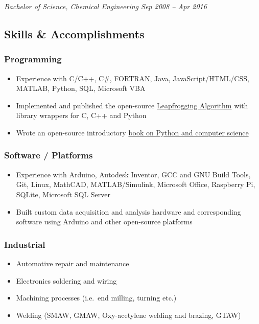 \emph{Bachelor of Science, Chemical Engineering \textbar{} Sep 2008 --
Apr 2016}

\hypertarget{skills-accomplishments}{%
\subsection{Skills \& Accomplishments}\label{skills-accomplishments}}

\hypertarget{programming}{%
\subsubsection{Programming}\label{programming}}

\begin{itemize}
\tightlist
\item
  Experience with C/C++, C\#, FORTRAN, Java, JavaScript/HTML/CSS,
  MATLAB, Python, SQL, Microsoft VBA
\item
  Implemented and published the open-source
  \href{https://github.com/flythereddflagg/lpfgopt}{Leapfrogging
  Algorithm} with library wrappers for C, C++ and Python
\item
  Wrote an open-source introductory
  \href{https://flythereddflagg.github.io/python_book/site/index.html}{book
  on Python and computer science}
\end{itemize}

\hypertarget{software-platforms}{%
\subsubsection{Software / Platforms}\label{software-platforms}}

\begin{itemize}
\tightlist
\item
  Experience with Arduino, Autodesk Inventor, GCC and GNU Build Tools,
  Git, Linux, MathCAD, MATLAB/Simulink, Microsoft Office, Raspberry Pi,
  SQLite, Microsoft SQL Server
\item
  Built custom data acquisition and analysis hardware and corresponding
  software using Arduino and other open-source platforms
\end{itemize}

\hypertarget{industrial}{%
\subsubsection{Industrial}\label{industrial}}

\begin{itemize}
\tightlist
\item
  Automotive repair and maintenance
\item
  Electronics soldering and wiring
\item
  Machining processes (i.e.~end milling, turning etc.)
\item
  Welding (SMAW, GMAW, Oxy-acetylene welding and brazing, GTAW)
\end{itemize}


